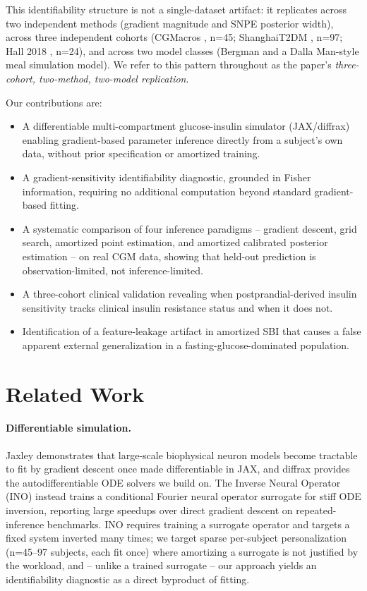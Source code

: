 \documentclass[letterpaper]{article} %
\begin{document}
This identifiability structure is not a single-dataset artifact: it replicates across two
independent methods (gradient magnitude and SNPE posterior width), across three independent
cohorts (CGMacros \citep{das2025cgmacros}, n=45; ShanghaiT2DM \citep{zhao2023shanghai}, n=97; Hall
2018 \citep{hall2018glucotypes}, n=24), and across two model classes
(Bergman and a Dalla Man-style meal simulation model). We refer to this pattern throughout as the
paper's \emph{three-cohort, two-method, two-model replication}.

Our contributions are:
\begin{itemize}
\item A differentiable multi-compartment glucose-insulin simulator (JAX/diffrax) enabling
  gradient-based parameter inference directly from a subject's own data, without prior
  specification or amortized training.
\item A gradient-sensitivity identifiability diagnostic, grounded in Fisher information, requiring
  no additional computation beyond standard gradient-based fitting.
\item A systematic comparison of four inference paradigms -- gradient descent, grid search,
  amortized point estimation, and amortized calibrated posterior estimation -- on real CGM data,
  showing that held-out prediction is observation-limited, not inference-limited.
\item A three-cohort clinical validation revealing when postprandial-derived insulin sensitivity
  tracks clinical insulin resistance status and when it does not.
\item Identification of a feature-leakage artifact in amortized SBI that causes a false apparent
  external generalization in a fasting-glucose-dominated population.
\end{itemize}

\section{Related Work}

\paragraph{Differentiable simulation.} Jaxley \citep{jaxley2025} demonstrates that large-scale
biophysical neuron models become tractable to fit by gradient descent once made differentiable in
JAX, and diffrax \citep{kidger2021diffrax} provides the autodifferentiable ODE solvers we build on.
The Inverse Neural Operator (INO) \citep{liu2026ino} instead trains a conditional Fourier neural
operator surrogate for stiff ODE inversion, reporting large speedups over direct gradient descent
on repeated-inference benchmarks. INO requires training a surrogate operator and targets a fixed
system inverted many times; we target sparse per-subject personalization (n=45--97 subjects, each
fit once) where amortizing a surrogate is not justified by the workload, and -- unlike a trained
surrogate -- our approach yields an identifiability diagnostic as a direct byproduct of fitting.
\end{document}
